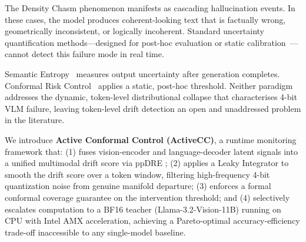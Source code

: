 \documentclass{ieeetmlcn}
\begin{document}
The Density Chasm phenomenon manifests as cascading hallucination events. In these cases, the model produces coherent-looking text that is factually wrong, geometrically inconsistent, or logically incoherent. Standard uncertainty quantification methods---designed for post-hoc evaluation or static calibration~\cite{angelopoulos2024conformal}---cannot detect this failure mode in real time.

Semantic Entropy~\cite{kuhn2023semantic} measures output uncertainty after generation completes. Conformal Risk Control~\cite{angelopoulos2024conformal} applies a static, post-hoc threshold. Neither paradigm addresses the dynamic, token-level distributional collapse that characterises 4-bit VLM failure, leaving token-level drift detection an open and unaddressed problem in the literature.

We introduce \textbf{Active Conformal Control (ActiveCC)}, a runtime
monitoring framework that: (1) fuses vision-encoder and language-decoder
latent signals into a unified multimodal drift score via ppDRE
\cite{wang2025projection}; (2) applies a Leaky Integrator to smooth the
drift score over a token window, filtering high-frequency 4-bit
quantization noise from genuine manifold departure; (3) enforces a
formal conformal coverage guarantee on the intervention threshold; and
(4) selectively escalates computation to a BF16 teacher
(Llama-3.2-Vision-11B) running on CPU with Intel AMX acceleration,
achieving a Pareto-optimal accuracy-efficiency trade-off inaccessible to
any single-model baseline.
\end{document}
